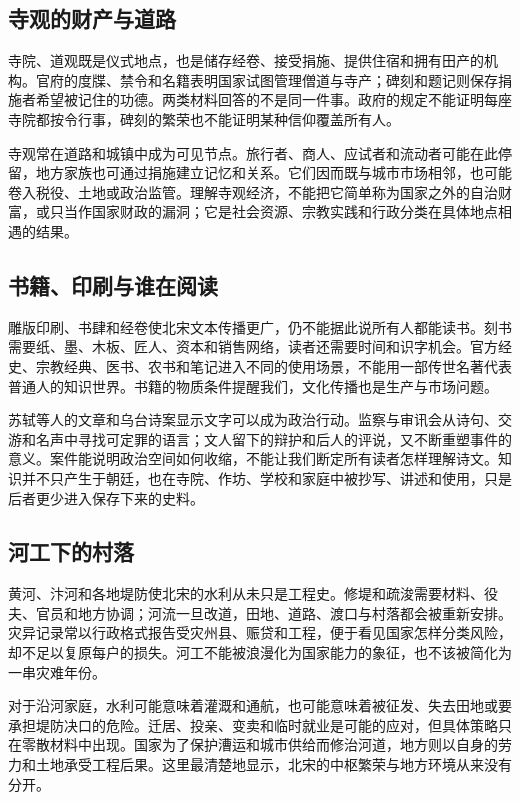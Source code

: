 \subsection{寺观的财产与道路}

寺院、道观既是仪式地点，也是储存经卷、接受捐施、提供住宿和拥有田产的机构。官府的度牒、禁令和名籍表明国家试图管理僧道与寺产；碑刻和题记则保存捐施者希望被记住的功德。两类材料回答的不是同一件事。政府的规定不能证明每座寺院都按令行事，碑刻的繁荣也不能证明某种信仰覆盖所有人。

寺观常在道路和城镇中成为可见节点。旅行者、商人、应试者和流动者可能在此停留，地方家族也可通过捐施建立记忆和关系。它们因而既与城市市场相邻，也可能卷入税役、土地或政治监管。理解寺观经济，不能把它简单称为国家之外的自治财富，或只当作国家财政的漏洞；它是社会资源、宗教实践和行政分类在具体地点相遇的结果。

\subsection{书籍、印刷与谁在阅读}

雕版印刷、书肆和经卷使北宋文本传播更广，仍不能据此说所有人都能读书。刻书需要纸、墨、木板、匠人、资本和销售网络，读者还需要时间和识字机会。官方经史、宗教经典、医书、农书和笔记进入不同的使用场景，不能用一部传世名著代表普通人的知识世界。书籍的物质条件提醒我们，文化传播也是生产与市场问题。

苏轼等人的文章和乌台诗案显示文字可以成为政治行动。监察与审讯会从诗句、交游和名声中寻找可定罪的语言；文人留下的辩护和后人的评说，又不断重塑事件的意义。案件能说明政治空间如何收缩，不能让我们断定所有读者怎样理解诗文。知识并不只产生于朝廷，也在寺院、作坊、学校和家庭中被抄写、讲述和使用，只是后者更少进入保存下来的史料。

\subsection{河工下的村落}

黄河、汴河和各地堤防使北宋的水利从未只是工程史。修堤和疏浚需要材料、役夫、官员和地方协调；河流一旦改道，田地、道路、渡口与村落都会被重新安排。灾异记录常以行政格式报告受灾州县、赈贷和工程，便于看见国家怎样分类风险，却不足以复原每户的损失。河工不能被浪漫化为国家能力的象征，也不该被简化为一串灾难年份。

对于沿河家庭，水利可能意味着灌溉和通航，也可能意味着被征发、失去田地或要承担堤防决口的危险。迁居、投亲、变卖和临时就业是可能的应对，但具体策略只在零散材料中出现。国家为了保护漕运和城市供给而修治河道，地方则以自身的劳力和土地承受工程后果。这里最清楚地显示，北宋的中枢繁荣与地方环境从来没有分开。

